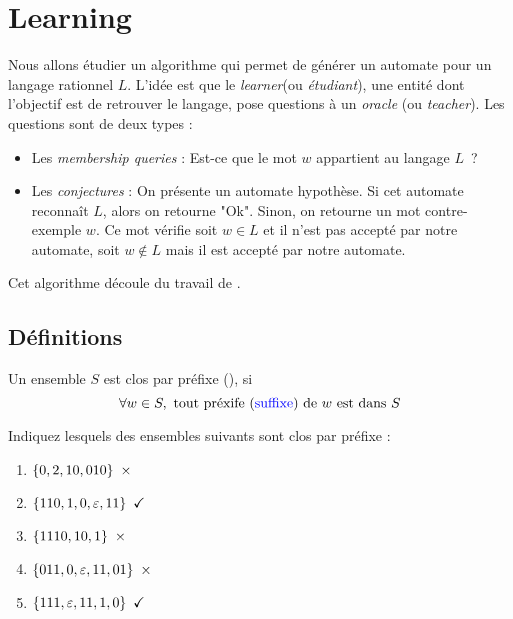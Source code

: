 \section{Learning}



Nous allons étudier un algorithme qui permet de générer un automate pour un langage rationnel $L$.
L'idée est que le \emph{learner}(ou \emph{étudiant}), une entité dont l'objectif est de retrouver le langage, pose
questions à un \emph{oracle} (ou \emph{teacher}). Les questions sont de deux types :

\begin{itemize}
	\item Les \emph{membership queries} : Est-ce que le mot $w$  appartient au langage $L$ ?
	\item Les \emph{conjectures} : On présente un automate hypothèse. Si cet automate reconnaît $L$, alors on retourne "Ok".
	      Sinon, on retourne un mot contre-exemple $w$. Ce mot vérifie soit $w \in L$ et il n’est pas accepté par notre
	      automate, soit $w \notin L$ mais il est accepté par notre automate.
\end{itemize}

Cet algorithme découle du travail de \cite{angluinLearning}.


\subsection{Définitions}


\begin{definition}
	Un ensemble $S$ est clos par préfixe (), si
	$$\forall w \in S, \text{ tout préxife (\textcolor{blue}{suffixe}) de $w$ est dans } S$$
\end{definition}

\begin{exercice}
	Indiquez lesquels des ensembles suivants sont clos par préfixe :
	\begin{enumerate}
		\item $\set{0,2,10,010} \ \times$
		\item $\set{110,1,0,\motvide,11} \ \checkmark$
		\item $\set{1110,10,1} \ \times$
		\item $\set{011,0,\motvide,11,01} \ \times$
		\item $\set{111,\motvide,11,1,0} \ \checkmark$
	\end{enumerate}
\end{exercice}

